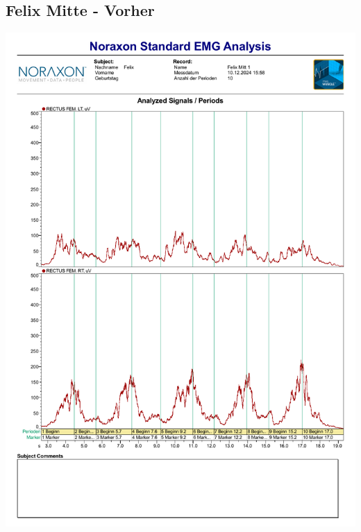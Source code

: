 \subsection*{Felix Mitte - Vorher}
\includegraphics[width=.9\textwidth]{img/pdfs/Felix_Mitte_1.pdf}
\clearpage

